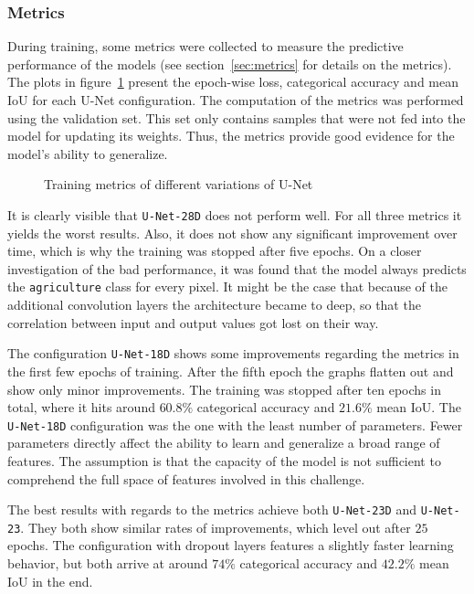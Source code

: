 \subsubsection{Metrics}
During training, some metrics were collected to measure the predictive performance of the models (see section~\ref{sec:metrics} for details on the metrics). The plots in figure~\ref{fig:unet_train_metrics} present the epoch-wise loss, categorical accuracy and mean IoU for each U-Net configuration. The computation of the metrics was performed using the validation set. This set only contains samples that were not fed into the model for updating its weights. Thus, the metrics provide good evidence for the model's ability to generalize.

\begin{figure}
    \newcommand{\UnetMetricsImageWidth}{0.32\textwidth}
    \centering
            
    \caption{Training metrics of different variations of U-Net}
    \label{fig:unet_train_metrics}
\end{figure}

It is clearly visible that \texttt{U-Net-28D} does not perform well. For all three metrics it yields the worst results. Also, it does not show any significant improvement over time, which is why the training was stopped after five epochs. On a closer investigation of the bad performance, it was found that the model always predicts the \texttt{agriculture} class for every pixel. It might be the case that because of the additional convolution layers the architecture became to deep, so that the correlation between input and output values got lost on their way.

The configuration \texttt{U-Net-18D} shows some improvements regarding the metrics in the first few epochs of training. After the fifth epoch the graphs flatten out and show only minor improvements. The training was stopped after ten epochs in total, where it hits around $60.8\%$ categorical accuracy and $21.6\%$ mean IoU. The \texttt{U-Net-18D} configuration was the one with the least number of parameters. Fewer parameters directly affect the ability to learn and generalize a broad range of features. The assumption is that the capacity of the model is not sufficient to comprehend the full space of features involved in this challenge.

The best results with regards to the metrics achieve both \texttt{U-Net-23D} and \texttt{U-Net-23}. They both show similar rates of improvements, which level out after $25$ epochs. The configuration with dropout layers features a slightly faster learning behavior, but both arrive at around $74\%$ categorical accuracy and $42.2\%$ mean IoU in the end.

